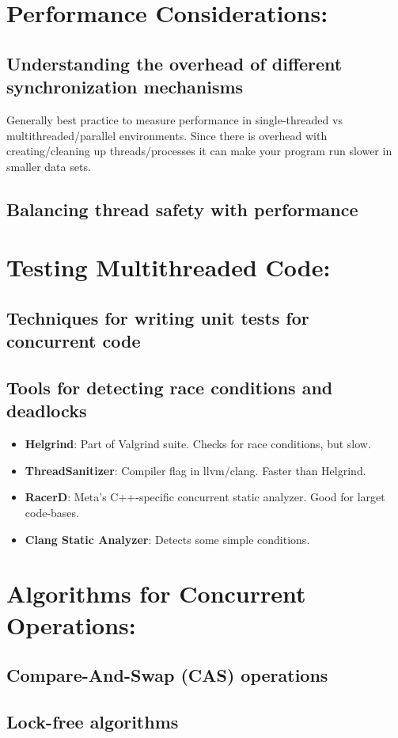 \documentclass{article}
\begin{document}
\section{Performance Considerations:}
\subsection{ Understanding the overhead of different synchronization mechanisms}
Generally best practice to measure performance in single-threaded vs multithreaded/parallel environments. Since there is overhead with creating/cleaning up threads/processes it can make your program run slower in smaller data sets.
\subsection{ Balancing thread safety with performance}
\section{Testing Multithreaded Code:}
\subsection{ Techniques for writing unit tests for concurrent code}
\subsection{ Tools for detecting race conditions and deadlocks}
\begin{itemize}
	\item \textbf{Helgrind}: Part of Valgrind suite. Checks for race conditions, but slow.
	\item \textbf{ThreadSanitizer}: Compiler flag in llvm/clang. Faster than Helgrind.
	\item \textbf{RacerD}: Meta's C++-specific concurrent static analyzer. Good for larget code-bases.
	\item \textbf{Clang Static Analyzer}: Detects some simple conditions.
\end{itemize}
\section{Algorithms for Concurrent Operations:}
\subsection{ Compare-And-Swap (CAS) operations}
\subsection{ Lock-free algorithms}
\end{document}
